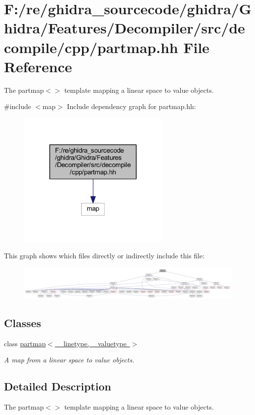 \hypertarget{partmap_8hh}{}\section{F\+:/re/ghidra\+\_\+sourcecode/ghidra/\+Ghidra/\+Features/\+Decompiler/src/decompile/cpp/partmap.hh File Reference}
\label{partmap_8hh}


The partmap$<$$>$ template mapping a linear space to value objects.  


{\ttfamily \#include $<$map$>$}\newline
Include dependency graph for partmap.\+hh\+:
\nopagebreak
\begin{figure}[H]
\begin{center}
\leavevmode
\includegraphics[width=212pt]{partmap_8hh__incl}
\end{center}
\end{figure}
This graph shows which files directly or indirectly include this file\+:
\nopagebreak
\begin{figure}[H]
\begin{center}
\leavevmode
\includegraphics[width=350pt]{partmap_8hh__dep__incl}
\end{center}
\end{figure}
\subsection*{Classes}
\begin{DoxyCompactItemize}
\item 
class \mbox{\hyperlink{classpartmap}{partmap$<$ \+\_\+linetype, \+\_\+valuetype $>$}}
\begin{DoxyCompactList}\small\item\em A map from a linear space to value objects. \end{DoxyCompactList}\end{DoxyCompactItemize}


\subsection{Detailed Description}
The partmap$<$$>$ template mapping a linear space to value objects. 

